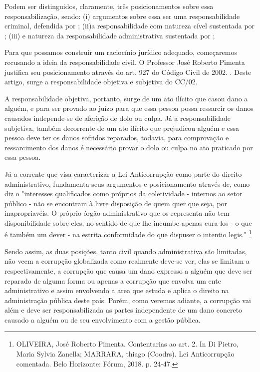 Podem ser distinguidos, claramente, três posicionamentos sobre essa responsabilização, sendo: (i) argumentos sobre essa ser uma responsabilidade criminal, defendida por \cite{modestocarvalhosa}; (ii)a responsabilidade com natureza cível sustentada por \cite{JosePimenta}; (iii) e natureza da responsabilidade administrativa sustentada por \cite{MariaSylvia};  

Para que possamos construir um raciocínio jurídico adequado, começaremos recusando a ideia da responsabilidade civil. O Professor José Roberto Pimenta justifica seu posicionamento através do art. 927 do Código Civil de 2002. \cite[Art. 927: aquele que, por ato ilícito, causar dano a outrem, fica obrigado a repara-lo]{Codigocivil}. Deste artigo, surge a responsabilidade objetiva e subjetiva do CC/02. 

A responsabilidade objetiva, portanto, surge de um ato ilícito que casou dano a alguém, e para ser provado ao juízo para que essa pessoa possa ressarcir os danos causados independe-se de aferição de dolo ou culpa. Já a responsabilidade subjetiva, também decorrente de um ato ilícito que prejudicou alguém e essa pessoa deve ter os danos sofridos reparados, todavia, para comprovação e ressarcimento dos danos é necessário provar o dolo ou culpa no ato praticado por essa pessoa. 

Já a corrente que visa caracterizar a Lei Anticorrupção como parte do direito administrativo, fundamenta seus argumentos e posicionamento através de, como diz \cite{MariaSylvia} o "interesses qualificados como próprios da coletividade - internos ao setor público - não se encontram à livre disposição de quem quer que seja, por inapropriavéis. O próprio órgão administrativo que os representa não tem disponibilidade sobre eles, no sentido de que lhe incumbe apenas cura-los - o que é também um dever - na estrita conformidade do que dispuser o intentio legis." \footnote{OLIVEIRA, José Roberto Pimenta. Contentarias ao art. 2. In Di Pietro, Maria Sylvia Zanella; MARRARA, thiago (Coodrs). Lei Anticorrupção comentada. Belo Horizonte: Fórum, 2018. p. 24-47.}

Sendo assim, as duas posições, tanto civil quando administrativa são limitadas, não veem a corrupção globalizada como realmente deve-se ver, elas se limitam a respectivamente, a corrupção que causa um dano expresso a alguém que deve ser reparado de alguma forma ou apenas a corrupção que envolva um ente administrativo e assim envolvendo a area que estuda e aplica o direito na administração pública deste país. Porém, como veremos adiante, a corrupção vai além e deve ser responsabilizada as partes independente de um dano concreto causado a alguém ou de seu envolvimento com a gestão pública. 

